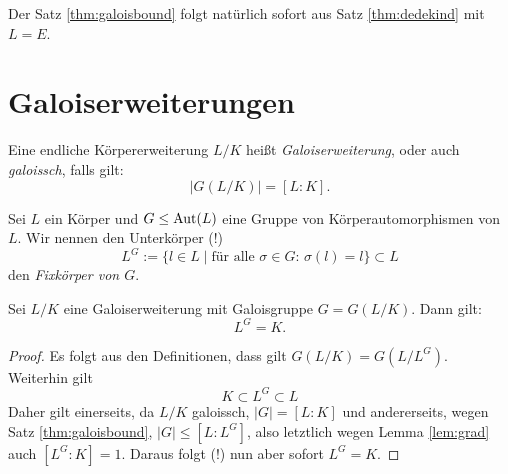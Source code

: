 \documentclass{book}
\begin{document}
Der Satz \ref{thm:galoisbound} folgt natürlich sofort aus Satz \ref{thm:dedekind} mit $L = E$. 

\section{Galoiserweiterungen}%
\label{sec:galoiserweiterungen}

\begin{defi}
    \label{defi:galois}
    Eine endliche Körpererweiterung $L/K$ heißt \emph{Galoiserweiterung}, oder
    auch \emph{galoissch}, falls gilt:
    \[
        |G(L/K)| = [L:K].
    \]
\end{defi}

Sei $L$ ein Körper und $G \le \operatorname{Aut}(L)$ eine Gruppe von Körperautomorphismen von $L$. Wir nennen den Unterkörper (!)
\[
    L^G := \{ l \in L \; |\; \text{für alle $\sigma \in G$: $\sigma(l) = l$} \} \subset L
\]
den \emph{Fixkörper von $G$}. 

\begin{thm}
    \label{thm:fix}
    Sei $L/K$ eine Galoiserweiterung mit Galoisgruppe $G = G(L/K)$. Dann gilt:
    \[
        L^G = K.
    \]
\end{thm}
\begin{proof}
    Es folgt aus den Definitionen, dass gilt $G(L/K) = G(L/L^G)$. Weiterhin gilt
    \[
        K \subset L^G \subset L
    \]
    Daher gilt einerseits, da $L/K$ galoissch, $|G| = [L:K]$ und andererseits,
    wegen Satz \ref{thm:galoisbound}, $|G| \le [L:L^G]$, also letztlich wegen
    Lemma \ref{lem:grad} auch $[L^G:K] = 1$. Daraus folgt (!) nun aber sofort
    $L^G = K$. 
\end{proof}
\end{document}
